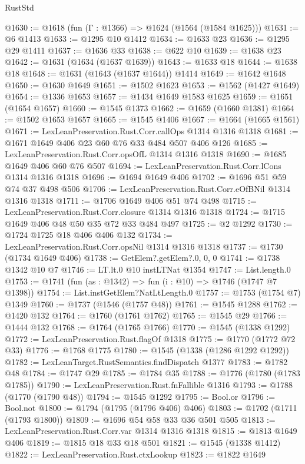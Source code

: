 \begin{lexlean}{RustStd}
\begin{coremodule}
{\begin{coremodule}
{{{{{{{{{{{{{{@1630 := @1618 (fun (Γ : @1366) => @1624 (@1564 (@1584 @1625)))
@1631 := @6 @1413
@1633 := @1295 @10 @1412
@1634 := @1633 @23
@1636 := @1295 @29 @1411
@1637 := @1636 @33
@1638 := @622 @10
@1639 := @1638 @23
@1642 := @1631 (@1634 (@1637 @1639))
@1643 := @1633 @18
@1644 := @1638 @18
@1648 := @1631 (@1643 (@1637 @1644)) @1414
@1649 := @1642 @1648
@1650 := @1630 @1649
@1651 := @1502 @1623
@1653 := @1562 (@1427 @1649)
@1654 := @1336 @1653
@1657 := @1434 @1649 @1583 @1625
@1659 := @1651 (@1654 @1657)
@1660 := @1545 @1373
@1662 := @1659 (@1660 @1381)
@1664 := @1502 @1653 @1657
@1665 := @1545 @1406
@1667 := @1664 (@1665 @1561)
@1671 := LexLeanPreservation.Rust.Corr.callOps @1314 @1316 @1318
@1681 := @1671 @1649 @406 @23 @60 @76 @33 @484 @507 @406 @126
@1685 := LexLeanPreservation.Rust.Corr.opsOfL @1314 @1316 @1318
@1690 := @1685 @1649 @406 @60 @76 @507
@1694 := LexLeanPreservation.Rust.Corr.lCons @1314 @1316 @1318
@1696 := @1694 @1649 @406
@1702 := @1696 @51 @59 @74 @37 @498 @506
@1706 := LexLeanPreservation.Rust.Corr.eOfBNil @1314 @1316 @1318
@1711 := @1706 @1649 @406 @51 @74 @498
@1715 := LexLeanPreservation.Rust.Corr.closure @1314 @1316 @1318
@1724 := @1715 @1649 @406 @48 @50 @35 @72 @33 @484 @497
@1725 := @2 @1292
@1730 := @1724 @1725 @18 @406 @406 @132
@1734 := LexLeanPreservation.Rust.Corr.opsNil @1314 @1316 @1318
@1737 := @1730 (@1734 @1649 @406)
@1738 := GetElem?.getElem?.{0, 0, 0}
@1741 := @1738 @1342 @10 @7
@1746 := LT.lt.{0} @10 instLTNat @1354
@1747 := List.length.{0}
@1753 := @1741 (fun (as : @1342) => fun (i : @10) => @1746 (@1747 @7 @1398))
@1754 := List.instGetElem?NatLtLength.{0}
@1757 := @1753 (@1754 @7) @1349
@1760 := @1737 (@1546 (@1757 @48))
@1761 := @1545 @1288
@1762 := @1420 @132
@1764 := @1760 (@1761 @1762)
@1765 := @1545 @29
@1766 := @1444 @132
@1768 := @1764 (@1765 @1766)
@1770 := @1545 (@1338 @1292)
@1772 := LexLeanPreservation.Rust.flagOf @1318
@1775 := @1770 (@1772 @72 @33)
@1776 := @1768 @1775
@1780 := @1545 (@1338 (@1286 @1292 @1292))
@1782 := LexLeanTarget.RustSemantics.findDispatch @1377
@1783 := @1782 @48
@1784 := @1747 @29
@1785 := @1784 @35
@1788 := @1776 (@1780 (@1783 @1785))
@1790 := LexLeanPreservation.Rust.fnFallible @1316
@1793 := @1788 (@1770 (@1790 @48))
@1794 := @1545 @1292
@1795 := Bool.or
@1796 := Bool.not
@1800 := @1794 (@1795 (@1796 @406) @406)
@1803 := @1702 (@1711 (@1793 @1800))
@1809 := @1696 @54 @58 @33 @36 @501 @505
@1813 := LexLeanPreservation.Rust.Corr.var @1314 @1316 @1318
@1815 := @1813 @1649 @406
@1819 := @1815 @18 @33 @18 @501
@1821 := @1545 (@1338 @1412)
@1822 := LexLeanPreservation.Rust.ctxLookup
@1823 := @1822 @1649
}}}}}}}}}}}}}}
\end{coremodule}}
\end{coremodule}
\end{lexlean}
